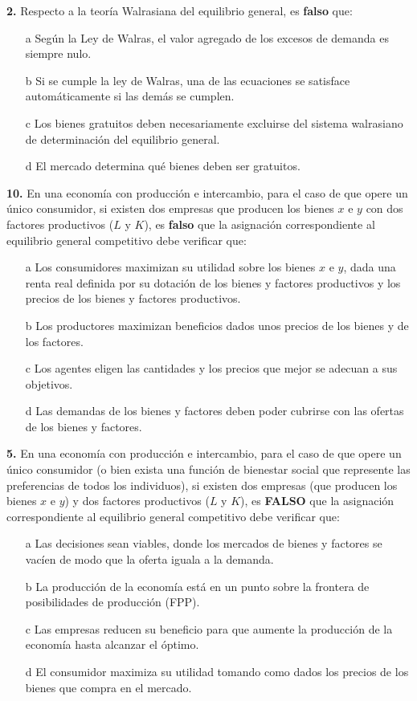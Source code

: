 \documentclass{nuevotema}
\begin{document}
\textbf{2.} Respecto a la teoría Walrasiana del equilibrio general, es \textbf{falso} que:
\begin{itemize}
	\item[a] Según la Ley de Walras, el valor agregado de los excesos de demanda es siempre nulo.
	\item[b] Si se cumple la ley de Walras, una de las ecuaciones se satisface automáticamente si las demás se cumplen.
	\item[c] Los bienes gratuitos deben necesariamente excluirse del sistema walrasiano de determinación del equilibrio general.
	\item[d] El mercado determina qué bienes deben ser gratuitos.
\end{itemize}

\textbf{10.} En una economía con producción e intercambio, para el caso de que opere un único consumidor, si existen dos empresas que producen los bienes $x$ e $y$ con dos factores productivos ($L$ y $K$), es \textbf{falso} que la asignación correspondiente al equilibrio general competitivo debe verificar que:
\begin{itemize}
	\item[a] Los consumidores maximizan su utilidad sobre los bienes $x$ e $y$, dada una renta real definida por su dotación de los bienes y factores productivos y los precios de los bienes y factores productivos.
	\item[b] Los productores maximizan beneficios dados unos precios de los bienes y de los factores.
	\item[c] Los agentes eligen las cantidades y los precios que mejor se adecuan a sus objetivos.
	\item[d] Las demandas de los bienes y factores deben poder cubrirse con las ofertas de los bienes y factores.
\end{itemize}


\textbf{5.} En una economía con producción e intercambio, para el caso de que opere un único consumidor (o bien exista una función de bienestar social que represente las preferencias de todos los individuos), si existen dos empresas (que producen los bienes $x$ e $y$) y dos factores productivos ($L$ y $K$), es \textbf{FALSO} que la asignación correspondiente al equilibrio general competitivo debe verificar que:
\begin{itemize}
	\item[a] Las decisiones sean viables, donde los mercados de bienes y factores se vacíen de modo que la oferta iguala a la demanda.
	\item[b] La producción de la economía está en un punto sobre la frontera de posibilidades de producción (FPP).
	\item[c] Las empresas reducen su beneficio para que aumente la producción de la economía hasta alcanzar el óptimo.
	\item[d] El consumidor maximiza su utilidad tomando como dados los precios de los bienes que compra en el mercado.
\end{itemize}
\end{document}
